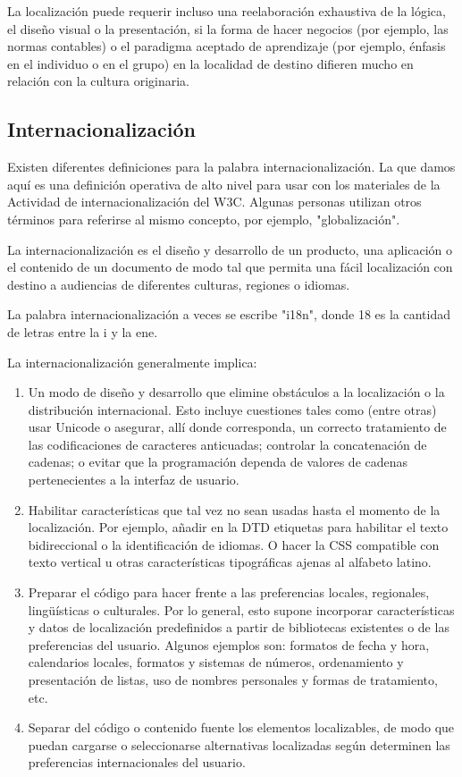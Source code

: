 La localización puede requerir incluso una reelaboración exhaustiva de la lógica, el diseño visual o la presentación, si la forma de hacer negocios (por ejemplo, las normas contables) o el paradigma aceptado de aprendizaje (por ejemplo, énfasis en el individuo o en el grupo) en la localidad de destino difieren mucho en relación con la cultura originaria.

\subsection{Internacionalización}

Existen diferentes definiciones para la palabra internacionalización. La que damos aquí es una definición operativa de alto nivel para usar con los materiales de la Actividad de internacionalización del W3C. Algunas personas utilizan otros términos para referirse al mismo concepto, por ejemplo, "globalización".

La internacionalización es el diseño y desarrollo de un producto, una aplicación o el contenido de un documento de modo tal que permita una fácil localización con destino a audiencias de diferentes culturas, regiones o idiomas.
\begin{remark}
	La palabra internacionalización a veces se escribe "i18n", donde 18 es la cantidad de letras entre la i y la ene.
\end{remark}

La internacionalización generalmente implica:

\begin{enumerate}
	\item Un modo de diseño y desarrollo que elimine obstáculos a la localización o la distribución internacional. Esto incluye cuestiones tales como (entre otras) usar Unicode o asegurar, allí donde corresponda, un correcto tratamiento de las codificaciones de caracteres anticuadas; controlar la concatenación de cadenas; o evitar que la programación dependa de valores de cadenas pertenecientes a la interfaz de usuario.
	\item Habilitar características que tal vez no sean usadas hasta el momento de la localización. Por ejemplo, añadir en la DTD etiquetas para habilitar el texto bidireccional o la identificación de idiomas. O hacer la CSS compatible con texto vertical u otras características tipográficas ajenas al alfabeto latino.
	\item Preparar el código para hacer frente a las preferencias locales, regionales, lingüísticas o culturales. Por lo general, esto supone incorporar características y datos de localización predefinidos a partir de bibliotecas existentes o de las preferencias del usuario. Algunos ejemplos son: formatos de fecha y hora, calendarios locales, formatos y sistemas de números, ordenamiento y presentación de listas, uso de nombres personales y formas de tratamiento, etc.
	\item Separar del código o contenido fuente los elementos localizables, de modo que puedan cargarse o seleccionarse alternativas localizadas según determinen las preferencias internacionales del usuario.
\end{enumerate}

